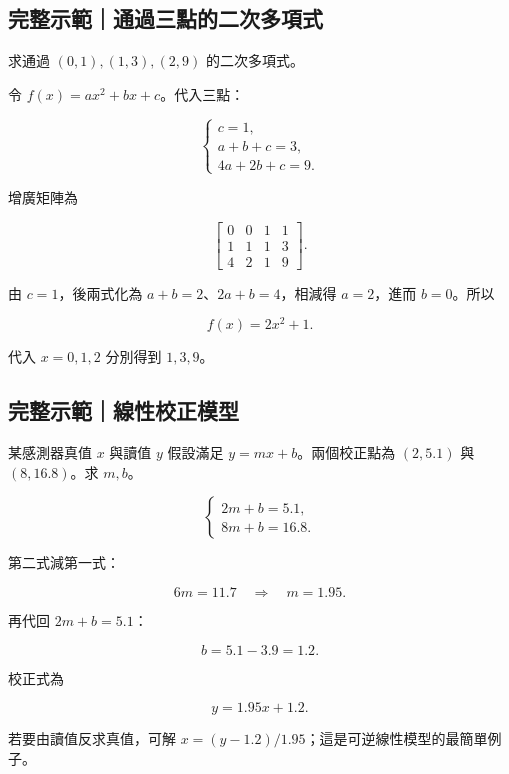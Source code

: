 \documentclass[11pt,a4paper]{article}
\begin{document}
\begin{HandoutWorkedExample}

\subsection{完整示範｜通過三點的二次多項式}\label{ux5b8cux6574ux793aux7bc4ux901aux904eux4e09ux9edeux7684ux4e8cux6b21ux591aux9805ux5f0f}

求通過 \((0,1),(1,3),(2,9)\) 的二次多項式。

令 \(f(x)=ax^2+bx+c\)。代入三點：

\[
\begin{cases}
c=1,\\
a+b+c=3,\\
4a+2b+c=9.
\end{cases}
\]

增廣矩陣為

\[
\left[
\begin{array}{ccc|c}
0&0&1&1\\
1&1&1&3\\
4&2&1&9
\end{array}
\right].
\]

由 \(c=1\)，後兩式化為 \(a+b=2\)、\(2a+b=4\)，相減得 \(a=2\)，進而 \(b=0\)。所以

\[
\boxed{f(x)=2x^2+1}.
\]

代入 \(x=0,1,2\) 分別得到 \(1,3,9\)。

\end{HandoutWorkedExample}

\begin{HandoutWorkedExample}

\subsection{完整示範｜線性校正模型}\label{ux5b8cux6574ux793aux7bc4ux7ddaux6027ux6821ux6b63ux6a21ux578b}

某感測器真值 \(x\) 與讀值 \(y\) 假設滿足 \(y=mx+b\)。兩個校正點為 \((2,5.1)\) 與 \((8,16.8)\)。求 \(m,b\)。

\[
\begin{cases}
2m+b=5.1,\\
8m+b=16.8.
\end{cases}
\]

第二式減第一式：

\[
6m=11.7
\quad\Longrightarrow\quad
m=1.95.
\]

再代回 \(2m+b=5.1\)：

\[
b=5.1-3.9=1.2.
\]

校正式為

\[
\boxed{y=1.95x+1.2}.
\]

若要由讀值反求真值，可解 \(x=(y-1.2)/1.95\)；這是可逆線性模型的最簡單例子。

\end{HandoutWorkedExample}
\end{document}
